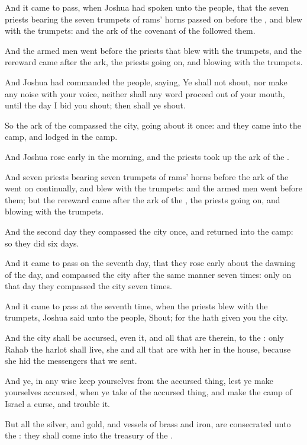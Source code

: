\Verse And it came to pass, when Joshua had spoken unto the people, that the seven priests bearing the seven trumpets of rams' horns passed on before the \LORD, and blew with the trumpets: and the ark of the covenant of the \LORD followed them.

\Verse And the armed men went before the priests that blew with the trumpets, and the rereward came after the ark, the priests going on, and blowing with the trumpets.

\Verse And Joshua had commanded the people, saying, Ye shall not shout, nor make any noise with your voice, neither shall any word proceed out of your mouth, until the day I bid you shout; then shall ye shout.

\Verse So the ark of the \LORD compassed the city, going about it once: and they came into the camp, and lodged in the camp.

\Verse And Joshua rose early in the morning, and the priests took up the ark of the \LORD.

\Verse And seven priests bearing seven trumpets of rams' horns before the ark of the \LORD went on continually, and blew with the trumpets: and the armed men went before them; but the rereward came after the ark of the \LORD, the priests going on, and blowing with the trumpets.

\Verse And the second day they compassed the city once, and returned into the camp: so they did six days.

\Verse And it came to pass on the seventh day, that they rose early about the dawning of the day, and compassed the city after the same manner seven times: only on that day they compassed the city seven times.

\Verse And it came to pass at the seventh time, when the priests blew with the trumpets, Joshua said unto the people, Shout; for the \LORD hath given you the city.

\Verse And the city shall be accursed, even it, and all that are therein, to the \LORD: only Rahab the harlot shall live, she and all that are with her in the house, because she hid the messengers that we sent.

\Verse And ye, in any wise keep yourselves from the accursed thing, lest ye make yourselves accursed, when ye take of the accursed thing, and make the camp of Israel a curse, and trouble it.

\Verse But all the silver, and gold, and vessels of brass and iron, are consecrated unto the \LORD: they shall come into the treasury of the \LORD.

